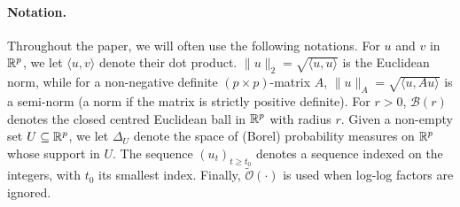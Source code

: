  
 \paragraph{Notation.}
 Throughout the paper, we will often use the following notations. For $u$ and $v$ in $\mathbb{R}^p$, we let $\langle u, v\rangle$ denote their dot product. $\|u\|_2 = \sqrt{\langle u, u\rangle}$ is the Euclidean norm, while for a non-negative definite $(p\times p)$-matrix $A$, $\|u\|_A = \sqrt{\langle u, Au\rangle}$ is a semi-norm (a norm if the matrix is strictly positive definite). For $r>0$, $\mathcal B(r)$ denotes the closed centred Euclidean ball in $\mathbb{R}^p$ with radius $r$. Given a non-empty set $U\subseteq\mathbb{R}^p$, we let $\Delta_U$ denote the space of (Borel) probability measures on $\mathbb{R}^p$ whose support in $U$. The sequence $(u_t)_{t\geq t_0}$ denotes a sequence indexed on the integers, with $t_0$ its smallest index. Finally,  $\widetilde{\mathcal{O}}(\cdot)$ is used when log-log factors are ignored.
